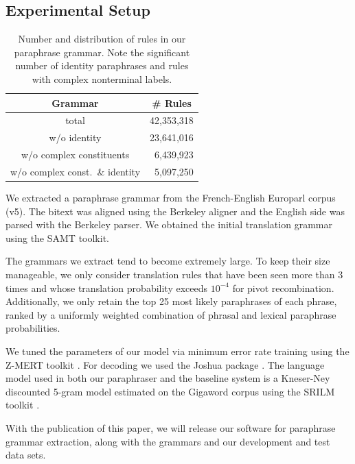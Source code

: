 \documentclass[11pt]{article}
\begin{document}
\subsection{Experimental Setup}
\label{setup}

\begin{table}
\small
\begin{center}
\begin{tabular}{|c|r|}
  \hline
  Grammar & \multicolumn{1}{c|}{\# Rules} \\
  \hline
  total & 42,353,318 \\
  w/o identity & 23,641,016 \\
  w/o complex constituents & 6,439,923 \\
  w/o complex const.\ \& identity & 5,097,250 \\
  \hline
\end{tabular}
\end{center}
\normalsize
\caption{Number and distribution of rules in our paraphrase
  grammar. Note the significant number of identity paraphrases and
  rules with complex nonterminal labels.}
\label{grammar_stats}
\end{table}

We extracted a paraphrase grammar from the French-English Europarl
corpus (v5). The bitext was aligned using the Berkeley aligner and the
English side was parsed with the Berkeley parser. We obtained the
initial translation grammar using the SAMT toolkit.

The grammars we extract tend to become extremely large. To keep their
size manageable, we only consider translation rules that have been
seen more than 3 times and whose translation probability exceeds
$10^{-4}$ for pivot recombination. Additionally, we only retain the
top 25 most likely paraphrases of each phrase, ranked by a uniformly
weighted combination of phrasal and lexical paraphrase probabilities.

We tuned the parameters of our model via minimum error rate training
using the Z-MERT toolkit \cite{Zaidan2009}. For decoding we used the
Joshua package \cite{Joshua-WMT}. The language model used in both our
paraphraser and the  baseline system is a
Kneser-Ney discounted 5-gram model estimated on the Gigaword corpus
using the SRILM toolkit \cite{SRILM}.

With the publication of this paper, we will release our software for
paraphrase grammar extraction, along with the grammars and our
development and test data sets.
\end{document}

